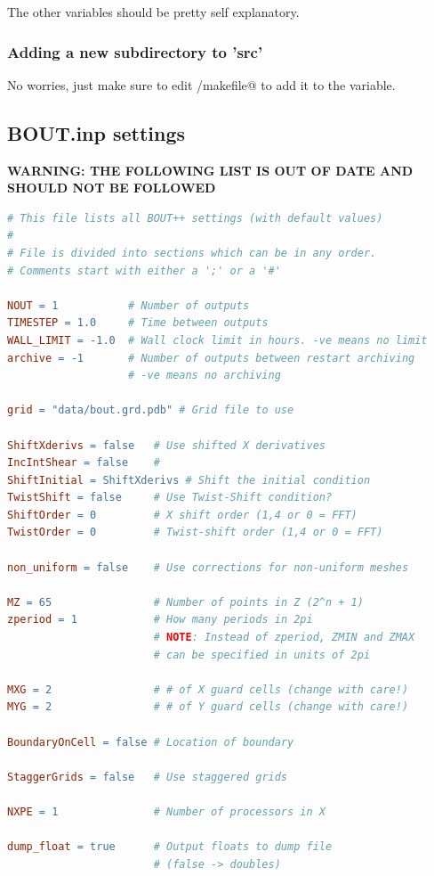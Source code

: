 \documentclass[12pt]{article}
\begin{document}
The other variables should be pretty self explanatory.

\subsubsection{Adding a new subdirectory to 'src'}
No worries, just make sure to edit \verb@src/makefile@ to add it to the 
\verb@DIRS@ variable.


\subsection{BOUT.inp settings}
{\color{red} \textbf{WARNING: THE FOLLOWING LIST IS OUT OF DATE AND SHOULD NOT 
BE FOLLOWED}}
%
\begin{lstlisting}[language=make,numbers=none]
# This file lists all BOUT++ settings (with default values)
#
# File is divided into sections which can be in any order.
# Comments start with either a ';' or a '#'

NOUT = 1           # Number of outputs
TIMESTEP = 1.0     # Time between outputs
WALL_LIMIT = -1.0  # Wall clock limit in hours. -ve means no limit
archive = -1       # Number of outputs between restart archiving
                   # -ve means no archiving

grid = "data/bout.grd.pdb" # Grid file to use

ShiftXderivs = false   # Use shifted X derivatives
IncIntShear = false    # 
ShiftInitial = ShiftXderivs # Shift the initial condition
TwistShift = false     # Use Twist-Shift condition?
ShiftOrder = 0         # X shift order (1,4 or 0 = FFT)
TwistOrder = 0         # Twist-shift order (1,4 or 0 = FFT)

non_uniform = false    # Use corrections for non-uniform meshes

MZ = 65                # Number of points in Z (2^n + 1)
zperiod = 1            # How many periods in 2pi
                       # NOTE: Instead of zperiod, ZMIN and ZMAX
                       # can be specified in units of 2pi

MXG = 2                # # of X guard cells (change with care!)
MYG = 2                # # of Y guard cells (change with care!)

BoundaryOnCell = false # Location of boundary

StaggerGrids = false   # Use staggered grids

NXPE = 1               # Number of processors in X

dump_float = true      # Output floats to dump file
                       # (false -> doubles)


\end{lstlisting}
\end{document}
